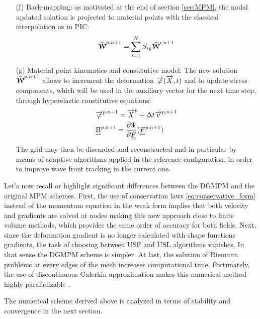 \begin{itemize}
\item[(f)] Back-mapping: as motivated at the end of section \ref{sec:MPM}, the nodal updated solution is projected to material points with the classical interpolation as in PIC:
  \begin{equation}
    \bar{{\boldsymbol{\mathcal{W}}}}^{p,n+1} = \sum_{i=1}^{N} S_{ip}\bar{{\boldsymbol{\mathcal{W}}}}^{i,n+1}
  \end{equation}
\item[(g)] Material point kinematics and constitutive model: The new solution $\bar{{\boldsymbol{\mathcal{W}}}}^{p,n+1}$ allows to increment the deformation ${\overrightarrow{\varphi}}({\overrightarrow{X}},t)$ and to update stress components, which will be used in the auxiliary vector for the next time step, through hyperelastic constitutive equations:
  \begin{align}
    & {\overrightarrow{\varphi}}^{p,n+1} = {\overrightarrow{X}}^p + \Delta t {\overrightarrow{v}}^{p,n+1} \\
    & {\underline{\underline{\Pi}}}^{p,n+1} =  \frac{\partial \Psi}{\partial {\underline{\underline{F}}}}({\underline{\underline{F}}}^{p,n+1})
  \end{align}
  The grid may then be discarded and reconstructed and in particular by means of adaptive algorithms applied in the reference configuration, in order to improve wave front tracking in the current one.
\end{itemize}

Let's now recall or highlight significant differences between the DGMPM and the original MPM schemes. 
First, the use of conservation laws \eqref{eq:conservative_form} instead of the momentum equation in the weak form implies that both velocity and gradients are solved at nodes making this new approach close to finite volume methods, which provides the same order of accuracy for both fields. 
Next, since the deformation gradient is no longer calculated with shape functions gradients, the task of choosing between USF and USL algorithms vanishes. In that sense the DGMPM scheme is simpler.
At last, the solution of Riemann problems at every edges of the mesh increases computational time. Fortunately, the use of discontinuous Galerkin approximation makes this numerical method highly parallelizable \cite{Cockburn}.

The numerical scheme derived above is analyzed in terms of stability and convergence in the next section.


